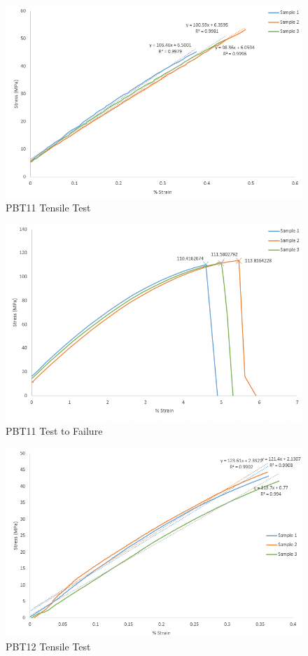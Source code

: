 \documentclass[11pt]{article}
\begin{document}
\begin{appendices}
\begin{figure}[H]
\centering
\includegraphics[width=.95\linewidth]{figures/PBT11_Tensile.png}
\caption{PBT11 Tensile Test}
\label{pbt11tensile}
\end{figure}

\begin{figure}[H]
\centering
\includegraphics[width=.95\linewidth]{figures/PBT11_Fail.png}
\caption{PBT11 Test to Failure}
\label{pbt11fail}
\end{figure}

\begin{figure}[H]
\centering
\includegraphics[width=.95\linewidth]{figures/PBT12_Tensile.png}
\caption{PBT12 Tensile Test}
\label{pbt12tensile}
\end{figure}


\end{appendices}
\end{document}

